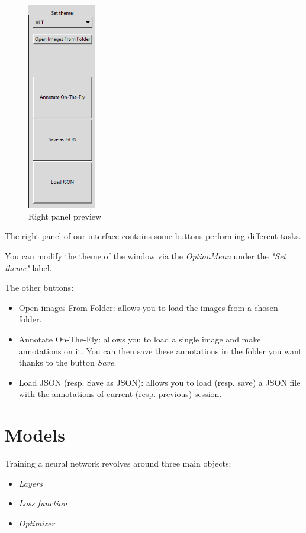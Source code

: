 \documentclass[a4paper,12pt]{article}
\begin{document}
\begin{figure}
    \centering
    \includegraphics[width=3cm]{Right_panel.png}
    \caption{Right panel preview}
    \label{fig:rgt_panel}
\end{figure}

The right panel of our interface contains some buttons performing different tasks.

You can modify the theme of the window via the \textit{OptionMenu} under the \textit{"Set theme"} label.

The other buttons:
\begin{itemize}
    \item Open images From Folder: allows you to load the images from a chosen folder.
    \item Annotate On-The-Fly: allows you to load a single image and make annotations on it. You can then save these annotations in the folder you want thanks to the button \textit{Save}.
  \item Load JSON (resp. Save as JSON): allows you to load (resp. save) a JSON file with the annotations of current (resp. previous) session.
\end{itemize}

\section{Models}
\label{sec:model}

Training a neural network revolves around three main objects:

\begin{itemize}
    \item \textit{Layers}
    \item \textit{Loss function}
    \item \textit{Optimizer}
\end{itemize}
\end{document}
